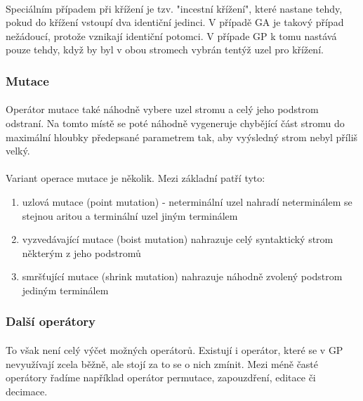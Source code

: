 \documentclass[bc,male,java,dept460]{diploma}		%
\begin{document}
\paragraph*{}
Speciálním případem při křížení je tzv. "incestní křížení", které nastane tehdy, pokud do křížení vstoupí dva identiční jedinci. V případě GA je takový případ nežádoucí, protože vznikají identiční potomci. V případe GP k tomu nastává pouze tehdy, když by byl v obou stromech vybrán tentýž uzel pro křížení.

\subsubsection{Mutace}
\paragraph*{}
Operátor mutace také náhodně vybere uzel stromu a celý jeho podstrom odstraní. Na tomto místě se poté náhodně vygeneruje chybějící část stromu do maximální hloubky předepsané parametrem tak, aby vyýsledný strom nebyl příliš velký. 


\paragraph*{}
Variant operace mutace je několik. Mezi základní patří tyto:
\begin{enumerate}
\item uzlová mutace (point mutation) - neterminální uzel nahradí neterminálem se stejnou aritou a terminální uzel jiným terminálem
\item vyzvedávající mutace (boist mutation) nahrazuje celý syntaktický strom některým z jeho podstromů
\item smršťující mutace (shrink mutation) nahrazuje náhodně zvolený podstrom jediným terminálem
\end{enumerate}

\subsubsection{Další operátory}
\paragraph*{}
To však není celý výčet možných operátorů. Existují i operátor, které se v GP nevyužívají zcela běžně, ale stojí za to se o nich zmínit. Mezi méně časté operátory řadíme například operátor permutace, zapouzdření, editace či decimace.
\end{document}
